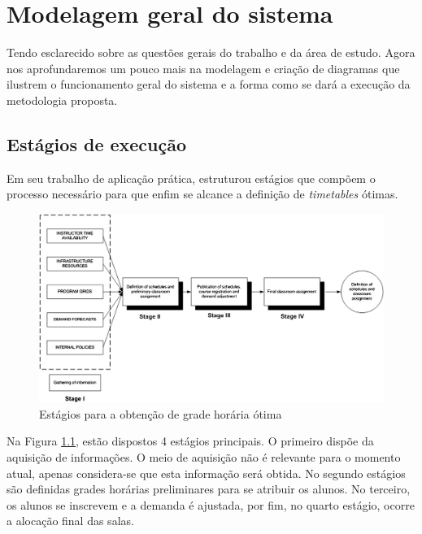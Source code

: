 \chapter{Modelagem geral do sistema}

Tendo esclarecido sobre as questões gerais do trabalho e da área de estudo. Agora nos aprofundaremos um pouco mais na modelagem e criação de diagramas que ilustrem o funcionamento geral do sistema e a forma como se dará a execução da metodologia proposta.

    \section{Estágios de execução}

        Em seu trabalho de aplicação prática, \cite{miranda_udpskeduler_2012} estruturou estágios que compõem o processo necessário para que enfim se alcance a definição de \textit{timetables} ótimas.

        \begin{figure}[htbp]\centering
            \caption{\label{fig:geral} Estágios para a obtenção de grade horária ótima}
            \includegraphics[scale=0.5]{files/img/Arquitetura/Arquitetura-UDP.png}
        \end{figure}

        Na Figura \ref{fig:geral}, estão dispostos 4 estágios principais. O primeiro dispõe da aquisição de informações. O meio de aquisição não é relevante para o momento atual, apenas considera-se que esta informação será obtida. No segundo estágios são definidas grades horárias preliminares para se atribuir os alunos. No terceiro, os alunos se inscrevem e a demanda é ajustada, por fim, no quarto estágio, ocorre a alocação final das salas.

